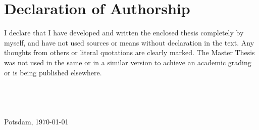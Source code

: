 \chapter*{Declaration of Authorship}
\thispagestyle{empty}
I declare that I have developed and written the enclosed thesis
completely by  myself, and have not used sources or means without declaration in the text.
Any thoughts from others or literal quotations are clearly marked.
The Master Thesis was not used in the same or in a similar version to achieve an academic grading or is being published elsewhere.
\\
\\
\\
\\
\\
Potsdam, \today
\\
\\
\\
\\
\AUTHOR

